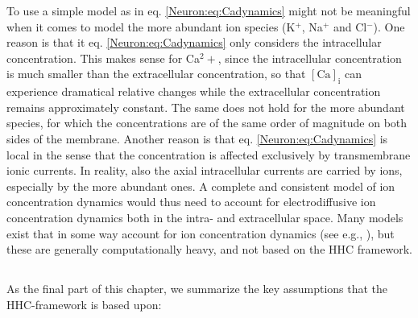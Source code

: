 To use a simple model as in eq. \ref{Neuron:eq:Cadynamics} might not be meaningful when it comes to model the more abundant ion species (K$^{+}$, Na$^{+}$ and Cl$^{-}$). One reason is that it eq. \ref{Neuron:eq:Cadynamics} only considers the intracellular concentration. This makes sense for Ca$^2+$, since the intracellular concentration is much smaller than the extracellular concentration, so that $\mathrm{[Ca]_i}$ can experience dramatical relative changes while the extracellular concentration remains approximately constant. The same does not hold for the more abundant species, for which the concentrations are of the same order of magnitude on both sides of the membrane. Another reason is that eq. \ref{Neuron:eq:Cadynamics} is local in the sense that the concentration is affected exclusively by transmembrane ionic currents. In reality, also the axial intracellular currents are carried by ions, especially by the more abundant ones. A complete and consistent model of ion concentration dynamics would thus need to account for electrodiffusive ion concentration dynamics both in the intra- and extracellular space. Many models exist that in some way account for ion concentration dynamics (see e.g., \cite{Qian1989, Kager2000, kneller2002, Cressman2009, WeiUllahSchiff2014, newton2018, Saetra2020, ellingsrud2020}), but these are generally computationally heavy, and not based on the HHC framework.


\subsection{}
\label{sec:Neuron:HHCassumptions}
As the final part of this chapter, we summarize the key assumptions that the HHC-framework is based upon:

